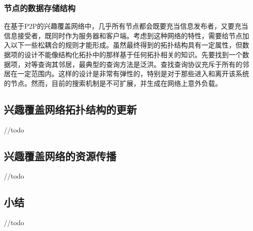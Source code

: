 \subsubsection{节点的数据存储结构}
在基于P2P的兴趣覆盖网络中，几乎所有节点都会既要充当信息发布者，又要充当信息接受者，既同时作为服务器和客户端。考虑到这种网络的特性，需要给节点加入以下一些松耦合的规则才能形成。虽然最终得到的拓扑结构具有一定属性，但数据项的设计不能像结构化拓扑中的那样基于任何拓扑相关的知识。先要找到一个数据项，对等查询其邻居，最典型的查询方法是泛洪。查找查询协议充斥于所有的邻居在一定范围内。这样的设计是非常有弹性的，特别是对于那些进入和离开该系统的节点。然而，目前的搜索机制是不可扩展，并生成在网络上意外负载。

\subsection{兴趣覆盖网络拓扑结构的更新}
//todo

\subsection{兴趣覆盖网络的资源传播}
//todo

\subsection{小结}
//todo
